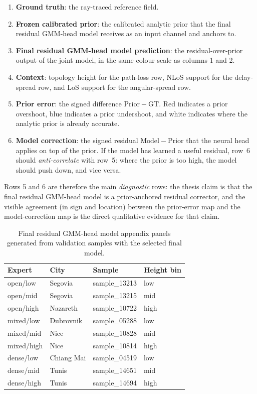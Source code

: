 \begin{enumerate}
\setlength\itemsep{0.15em}
  \item \textbf{Ground truth}: the ray-traced reference field.
  \item \textbf{Frozen calibrated prior}: the calibrated analytic prior
        that the final residual GMM-head model receives as an input channel and anchors to.
  \item \textbf{Final residual GMM-head model prediction}: the residual-over-prior output
        of the joint model, in the same colour scale as columns 1 and 2.
  \item \textbf{Context}: topology height for the path-loss row, NLoS
        support for the delay-spread row, and LoS support for the
        angular-spread row.
  \item \textbf{Prior error}: the signed difference
        \(\mathrm{Prior}-\mathrm{GT}\). Red indicates a prior overshoot,
        blue indicates a prior undershoot, and white indicates where the
        analytic prior is already accurate.
  \item \textbf{Model correction}: the signed residual
        \(\mathrm{Model}-\mathrm{Prior}\) that the neural head applies on
        top of the prior. If the model has learned a useful residual,
        row~6 should \emph{anti-correlate} with row~5: where the prior
        is too high, the model should push down, and vice versa.
\end{enumerate}

Rows 5 and 6 are therefore the main \emph{diagnostic} rows: the thesis
claim is that the final residual GMM-head model is a prior-anchored residual corrector, and the visible
agreement (in sign and location) between the prior-error map and the
model-correction map is the direct qualitative evidence for that claim.

\begin{table}[H]
\centering
\caption[Final-model appendix panel index.]%
{Final residual GMM-head model appendix panels generated from validation samples with the
selected final model.}
\label{tab:try80_appendix_panels}
\footnotesize
\begin{tabular}{llll}
\toprule
Expert & City & Sample & Height bin \\
\midrule
open/low & Segovia & sample\_13213 & low \\
open/mid & Segovia & sample\_13215 & mid \\
open/high & Nazareth & sample\_10722 & high \\
mixed/low & Dubrovnik & sample\_05288 & low \\
mixed/mid & Nice & sample\_10828 & mid \\
mixed/high & Nice & sample\_10814 & high \\
dense/low & Chiang Mai & sample\_04519 & low \\
dense/mid & Tunis & sample\_14651 & mid \\
dense/high & Tunis & sample\_14694 & high \\
\bottomrule
\end{tabular}
\end{table}

